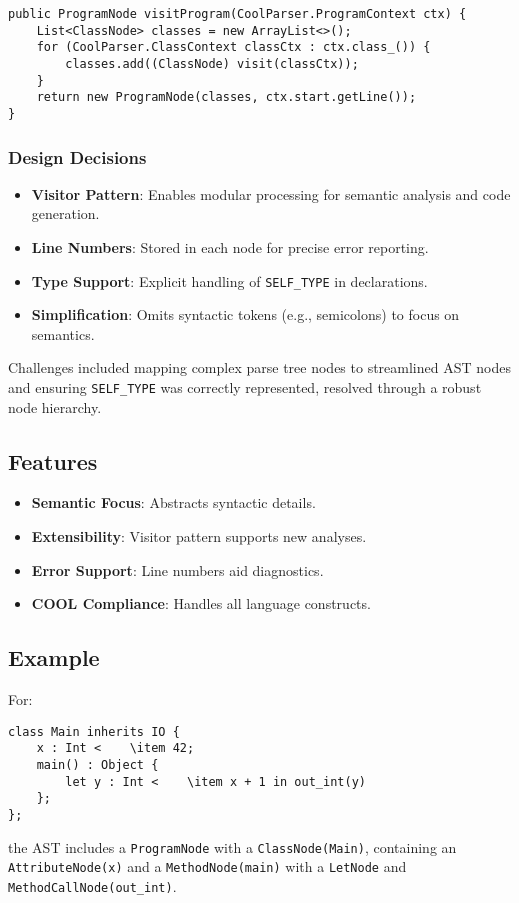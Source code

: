 \documentclass[11pt, titlepage]{article}
\begin{document}
\begin{lstlisting}
public ProgramNode visitProgram(CoolParser.ProgramContext ctx) {
    List<ClassNode> classes = new ArrayList<>();
    for (CoolParser.ClassContext classCtx : ctx.class_()) {
        classes.add((ClassNode) visit(classCtx));
    }
    return new ProgramNode(classes, ctx.start.getLine());
}
\end{lstlisting}

\subsubsection{Design Decisions}

\begin{itemize}[leftmargin=*]
    \item \textbf{Visitor Pattern}: Enables modular processing for semantic analysis and code generation.
    \item \textbf{Line Numbers}: Stored in each node for precise error reporting.
    \item \textbf{Type Support}: Explicit handling of \texttt{SELF\_TYPE} in declarations.
    \item \textbf{Simplification}: Omits syntactic tokens (e.g., semicolons) to focus on semantics.
\end{itemize}

Challenges included mapping complex parse tree nodes to streamlined AST nodes and ensuring \texttt{SELF\_TYPE} was correctly represented, resolved through a robust node hierarchy.

\subsection{Features}
\begin{itemize}[leftmargin=*]
    \item \textbf{Semantic Focus}: Abstracts syntactic details.
    \item \textbf{Extensibility}: Visitor pattern supports new analyses.
    \item \textbf{Error Support}: Line numbers aid diagnostics.
    \item \textbf{COOL Compliance}: Handles all language constructs.
\end{itemize}

\subsection{Example}
For:
\begin{lstlisting}
class Main inherits IO {
    x : Int <    \item 42;
    main() : Object {
        let y : Int <    \item x + 1 in out_int(y)
    };
};
\end{lstlisting}
the AST includes a \texttt{ProgramNode} with a \texttt{ClassNode(Main)}, containing an \texttt{AttributeNode(x)} and a \texttt{MethodNode(main)} with a \texttt{LetNode} and \texttt{MethodCallNode(out\_int)}.
\end{document}
